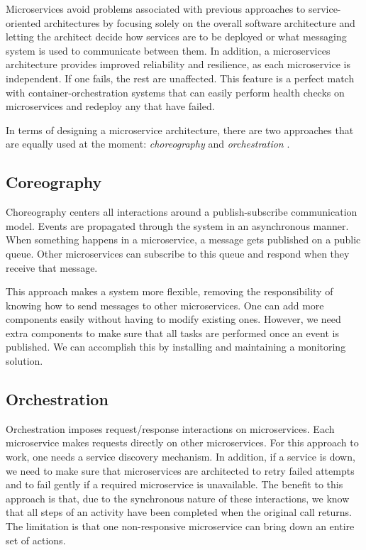 Microservices avoid problems associated with previous approaches to service-oriented architectures by focusing solely on the overall software architecture and letting the architect decide how services are to be deployed or what messaging system is used to communicate between them. In addition, a microservices architecture provides improved reliability and resilience, as each microservice is independent. If one fails, the rest are unaffected. This feature is a perfect match with container-orchestration systems that can easily perform health checks on microservices and redeploy any that have failed.

In terms of designing a microservice architecture, there are two approaches that are equally used at the moment: \textit{choreography} and \textit{orchestration} \parencite{microservices}.


\subsection{Coreography}

Choreography centers all interactions around a publish-subscribe communication model. Events are propagated through the system in an asynchronous manner. When something happens in a microservice, a message gets published on a public queue. Other microservices can subscribe to this queue and respond when they receive that message.

This approach makes a system more flexible, removing the responsibility of knowing how to send messages to other microservices. One can add more components easily without having to modify existing ones. However, we need extra components to make sure that all tasks are performed once an event is published. We can accomplish this by installing and maintaining a monitoring solution.



\subsection{Orchestration}

Orchestration imposes request/response interactions on microservices. Each microservice makes requests directly on other microservices. For this approach to work, one needs a service discovery mechanism. In addition, if a service is down, we need to make sure that microservices are architected to retry failed attempts and to fail gently if a required microservice is unavailable. The benefit to this approach is that, due to the synchronous nature of these interactions, we know that all steps of an activity have been completed when the original call returns. The limitation is that one non-responsive microservice can bring down an entire set of actions.

